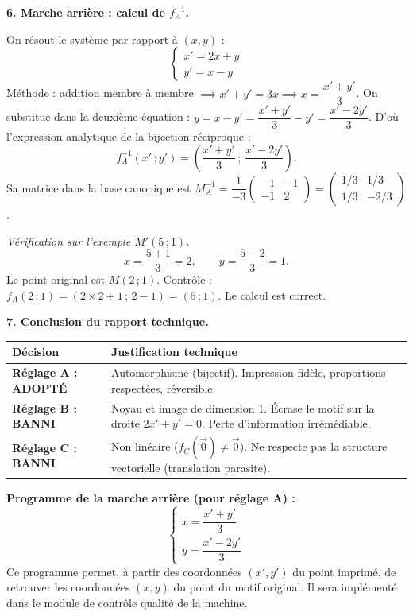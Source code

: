 \documentclass[11pt]{article}
\begin{document}
\begin{exoresolu}
\medskip

\textbf{6. Marche arrière : calcul de $f_A^{-1}$.}

On résout le système par rapport à $(x,y)$ :
\[ \begin{cases} x' = 2x + y \\ y' = x - y \end{cases} \]
Méthode : addition membre à membre $\implies x' + y' = 3x \implies x = \dfrac{x'+y'}{3}$.
On substitue dans la deuxième équation : $y = x - y' = \dfrac{x'+y'}{3} - y' = \dfrac{x' - 2y'}{3}$.
D'où l'expression analytique de la bijection réciproque :
\[ f_A^{-1}(x'\,;y') = \left(\dfrac{x'+y'}{3}\,;\,\dfrac{x'-2y'}{3}\right). \]
Sa matrice dans la base canonique est $M_A^{-1} = \dfrac{1}{-3}\begin{pmatrix} -1 & -1 \\ -1 & 2 \end{pmatrix} = \begin{pmatrix} 1/3 & 1/3 \\ 1/3 & -2/3 \end{pmatrix}$.

\emph{Vérification sur l'exemple $M'(5\,;1)$.}
\[ x = \frac{5+1}{3} = 2, \qquad y = \frac{5-2}{3} = 1. \]
Le point original est $M(2\,;1)$. Contrôle : $f_A(2\,;1) = (2\times2+1\,;\,2-1) = (5\,;1)$. Le calcul est correct.

\medskip

\textbf{7. Conclusion du rapport technique.}

\begin{center}
\begin{tabular}{|p{4cm}|p{11cm}|}
\hline
\rowcolor{popgreenL} \textbf{Décision} & \textbf{Justification technique} \\
\hline
\textbf{Réglage A : ADOPTÉ} & Automorphisme (bijectif). Impression fidèle, proportions respectées, réversible. \\
\hline
\textbf{Réglage B : BANNI} & Noyau et image de dimension 1. Écrase le motif sur la droite $2x'+y'=0$. Perte d'information irrémédiable. \\
\hline
\textbf{Réglage C : BANNI} & Non linéaire ($f_C(\vec{0}) \neq \vec{0}$). Ne respecte pas la structure vectorielle (translation parasite). \\
\hline
\end{tabular}
\end{center}

\textbf{Programme de la marche arrière (pour réglage A) :}
\[ \boxed{ \begin{cases} x = \dfrac{x'+y'}{3} \\[6pt] y = \dfrac{x'-2y'}{3} \end{cases} } \]
Ce programme permet, à partir des coordonnées $(x',y')$ du point imprimé, de retrouver les coordonnées $(x,y)$ du point du motif original. Il sera implémenté dans le module de contrôle qualité de la machine.
\end{exoresolu}
\end{document}
